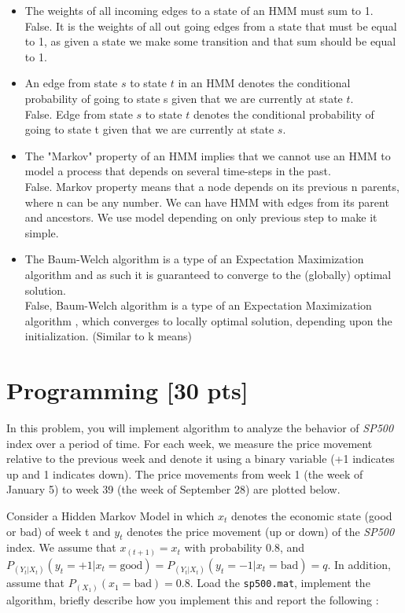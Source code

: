 \documentclass[twoside,11pt]{article}\usepackage{amsmath,amsfonts,amsthm,fullpage}
\begin{document}
\begin{itemize}
  \item The weights of all incoming edges to a state of an HMM must sum to 1.\\
  False. It is the weights of all out going edges from a state that must be equal to 1, as given a state we make some transition and that sum should be equal to 1.
  \item An edge from state $s$ to state $t$ in an HMM denotes the conditional probability of going to state s given that we are currently at state $t$.\\
  False. Edge from state $s$ to state $t$  denotes the conditional probability of going to state t given that we are currently at state $s$.
  \item The "Markov" property of an HMM implies that we cannot use an HMM to model a process that depends on several time-steps in the past.\\
  False. Markov property means that a node depends on its previous n parents, where n can be any number. We can have HMM with edges from its parent and ancestors. We use model depending on only previous step to make it simple.
  \item The Baum-Welch algorithm is a type of an Expectation Maximization algorithm and as such it is guaranteed to converge to the (globally) optimal solution. \\
  False, Baum-Welch algorithm is a type of an Expectation Maximization algorithm , which converges to locally optimal solution, depending upon the initialization. (Similar to k means)
\end{itemize}


\section{Programming [30 pts]}

In this problem, you will implement  algorithm to analyze the
behavior of \emph{SP500} index over a period of time. For each week,
we measure the price movement relative to the previous week and
denote it using a binary variable (+1 indicates up and 1 indicates
down). The price movements from week 1 (the week of January 5) to
week 39 (the week of September 28) are plotted below.

Consider a Hidden Markov Model in which $x_t$ denotes the economic
state (good or bad) of week t and $y_t$ denotes the price movement
(up or down) of the \emph{SP500} index. We assume that
$x_{(t+1)}=x_t$ with probability 0.8, and
$P_{(Y_t|X_t)}(y_t=+1|x_t=\text{good}) =
P_{(Y_t|X_t)}(y_t=-1|x_t=\text{bad}) = q.$ In addition, assume that
$P_{(X_1)}(x_1=\text{bad}) = 0.8$. Load the \texttt{sp500.mat},
implement the algorithm, briefly describe how you implement this and
report the following :
\end{document}
